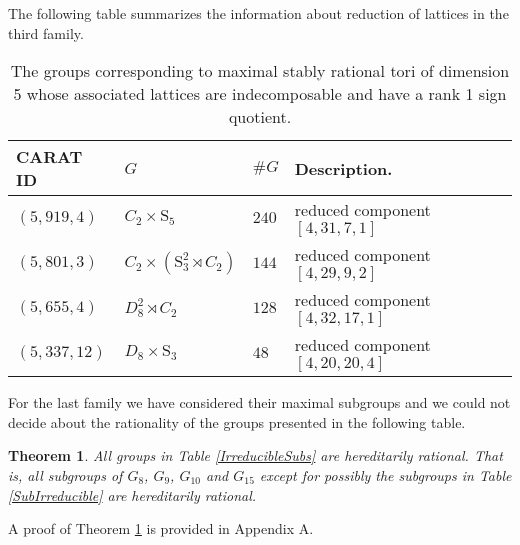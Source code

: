 \documentclass[12pt]{article}
\theoremstyle{plain}
\newtheorem{theorem}{Theorem}
\theoremstyle{definition}
\begin{document}
The following table summarizes the information about reduction of lattices in the third family.
 \begin{table}[H]
\centering
\begin{tabular}{lllll} 
 CARAT ID & $G$ & $\#G$ & Description.\\\hline
 $(5,919,4)$ & $C_2\times \mathrm{S}_5$ & $240$  &  reduced component $[4,31,7,1]$ \\
 $(5,801,3)$ & $C_2\times (\mathrm{S}_3^2\rtimes C_2)$ & $144$  &reduced component $[ 4, 29, 9, 2 ]$  \\
 $(5,655,4)$ & $D_8^2\rtimes C_2$ & $128$  & reduced component $[4,32,17,1]$    \\
 $(5,337,12)$ & $D_8\times \mathrm{S}_3$ & $48$  &  reduced component $[ 4, 20, 20, 4 ]$   &\\
\end{tabular}
\caption{The groups corresponding to maximal stably rational tori of dimension 5 whose associated lattices are indecomposable and have a rank 1 sign quotient.}
\label{SignPerm}
\end{table}
For the last family we have considered their maximal subgroups and we could not decide about the rationality of the groups presented in the following table.
\begin{theorem}\label{SubG8}
All groups in Table \ref{IrreducibleSubs} are hereditarily rational. That is, all subgroups of $G_8$, $G_9$, $G_{10}$ and $G_{15}$ except for possibly the subgroups in Table \ref{SubIrreducible} are hereditarily rational.
\end{theorem}
A proof of Theorem \ref{SubG8} is provided in Appendix A.
\end{document}
